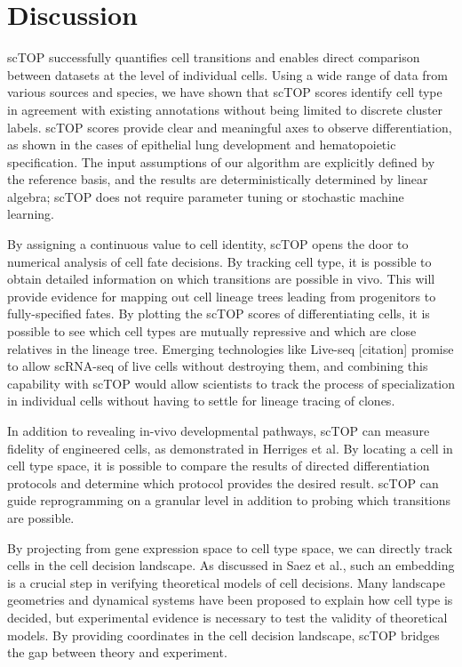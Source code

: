 \documentclass[aps,superscriptaddress, notitlepage,longbibliography]{revtex4-1}
\begin{document}
\section{Discussion}

scTOP successfully quantifies cell transitions and enables direct comparison between datasets at the level of individual cells. Using a wide range of data from various sources and species, we have shown that scTOP scores identify cell type in agreement with existing annotations without being limited to discrete cluster labels. scTOP scores provide clear and meaningful axes to observe differentiation, as shown in the cases of epithelial lung development and hematopoietic specification. The input assumptions of our algorithm are explicitly defined by the reference basis, and the results are deterministically determined by linear algebra; scTOP does not require parameter tuning or stochastic machine learning. 

By assigning a continuous value to cell identity, scTOP opens the door to numerical analysis of cell fate decisions. By tracking cell type, it is possible to obtain detailed information on which transitions are possible in vivo. This will provide evidence for mapping out cell lineage trees leading from progenitors to fully-specified fates. By plotting the scTOP scores of differentiating cells, it is possible to see which cell types are mutually repressive and which are close relatives in the lineage tree. Emerging technologies like Live-seq [citation] promise to allow scRNA-seq of live cells without destroying them, and combining this capability with scTOP would allow scientists to track the process of specialization in individual cells without having to settle for lineage tracing of clones.

In addition to revealing in-vivo developmental pathways, scTOP can measure fidelity of engineered cells, as demonstrated in Herriges et al. By locating a cell in cell type space, it is possible to compare the results of directed differentiation protocols and determine which protocol provides the desired result. scTOP can guide reprogramming on a granular level in addition to probing which transitions are possible.

By projecting from gene expression space to cell type space, we can directly track cells in the cell decision landscape. As discussed in Saez et al.\cite{saez_dynamical_nodate}, such an embedding is a crucial step in verifying theoretical models of cell decisions. Many landscape geometries and dynamical systems have been proposed to explain how cell type is decided, but experimental evidence is necessary to test the validity of theoretical models. By providing coordinates in the cell decision landscape, scTOP bridges the gap between theory and experiment.
\end{document}
